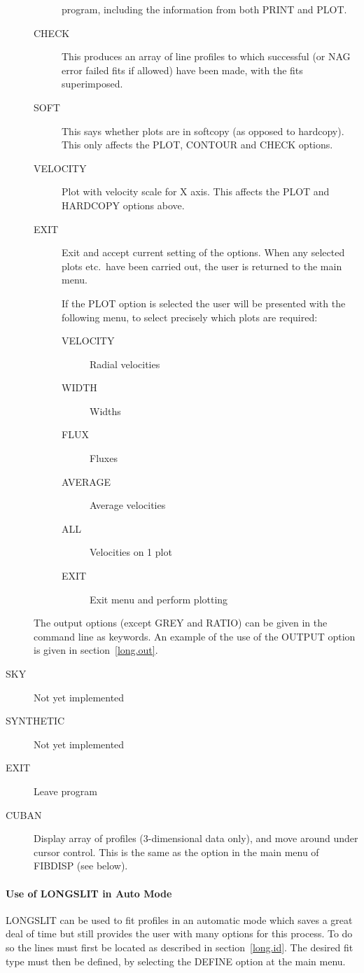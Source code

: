 \begin{description}
\begin{description}
program, including the information from both PRINT and PLOT.
\item[CHECK] This produces an array of line profiles to which successful
(or NAG error failed fits if allowed) have been made, with the fits
superimposed.
\item[SOFT] This says whether plots are in softcopy (as opposed to
hardcopy). This only affects the PLOT, CONTOUR and CHECK options.
\item[VELOCITY] Plot with velocity scale for X axis. This affects the PLOT
and HARDCOPY options above.
\item[EXIT] Exit and accept current setting of the options.
When any selected plots etc.\ have been carried out, the user is
returned to the main menu.

If the PLOT option is selected the user will be presented with the
following menu, to select precisely which plots are required:
\begin{description}
\item[VELOCITY] Radial velocities
\item[WIDTH] Widths
\item[FLUX] Fluxes
\item[AVERAGE] Average velocities
\item[ALL] Velocities on 1 plot
\item[EXIT] Exit menu and perform plotting
\end{description}
\end{description}
The output options (except GREY and RATIO) can be given in the command
line as keywords.
An example of the use of the OUTPUT option is given in
section~\ref{long.out}.
\item[SKY] Not yet implemented
\item[SYNTHETIC] Not yet implemented
\item[EXIT] Leave program
\item[CUBAN] Display array of profiles (3-dimensional data only), and move
around under cursor control. This is the same as the option in the main menu
of FIBDISP (see below).
\end{description}

\paragraph{Use of LONGSLIT in Auto Mode}

LONGSLIT can be used to fit profiles in an automatic mode which saves
a great deal of time but still provides the user with many options for
this process.
To do so the lines must first be located as described in
section~\ref{long.id}.
The desired fit type must then be defined, by selecting the DEFINE
option at the main menu.

